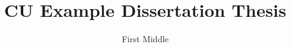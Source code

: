 \documentclass[defaultstyle,11pt]{thesis}
\title{CU Example Dissertation Thesis}
\author{First Middle}{Last}
\begin{document}
\graphicspath{{\subfix{figures}}}



















\appendix

\end{document}
